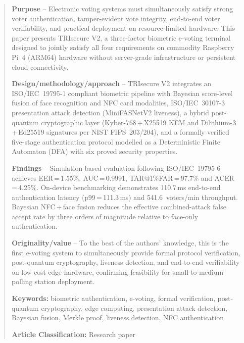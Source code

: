 \documentclass[a4paper,12pt]{article}
\begin{document}
\begin{abstract}
\noindent\textbf{Purpose} --
Electronic voting systems must simultaneously satisfy strong voter
authentication, tamper-evident vote integrity, end-to-end voter
verifiability, and practical deployment on resource-limited hardware.
This paper presents TRIsecure V2, a three-factor biometric e-voting
terminal designed to jointly satisfy all four requirements on commodity
Raspberry Pi~4 (ARM64) hardware without server-grade infrastructure or
persistent cloud connectivity.

\medskip\noindent\textbf{Design/methodology/approach} --
TRIsecure V2 integrates an ISO/IEC~19795-1 compliant biometric pipeline
with Bayesian score-level fusion of face recognition and NFC card
modalities, ISO/IEC~30107-3 presentation attack detection (MiniFASNetV2
liveness), a hybrid post-quantum cryptographic layer (Kyber-768\,+\,X25519
KEM and Dilithium-3\,+\,Ed25519 signatures per NIST FIPS~203/204), and a
formally verified five-stage authentication protocol modelled as a
Deterministic Finite Automaton (DFA) with six proved security properties.

\medskip\noindent\textbf{Findings} --
Simulation-based evaluation following ISO/IEC~19795-6 achieves
EER\,=\,1.55\%, AUC\,=\,0.9991, TAR@1\%FAR\,=\,97.7\% and
ACER\,=\,4.25\%. On-device benchmarking demonstrates 110.7\,ms
end-to-end authentication latency (p99\,=\,111.3\,ms) and
541.6~voters/min throughput. Bayesian NFC\,+\,face fusion reduces the
effective combined-attack false accept rate by three orders of magnitude
relative to face-only authentication.

\medskip\noindent\textbf{Originality/value} --
To the best of the authors' knowledge, this is the first e-voting system
to simultaneously provide formal protocol verification, post-quantum
cryptography, liveness detection, and end-to-end verifiability on
low-cost edge hardware, confirming feasibility for small-to-medium
polling station deployment.

\medskip\noindent\textbf{Keywords:} biometric authentication, e-voting,
formal verification, post-quantum cryptography, edge computing,
presentation attack detection, Bayesian fusion, Merkle proof, liveness
detection, NFC authentication

\medskip\noindent\textbf{Article Classification:} Research paper
\end{abstract}
\end{document}
